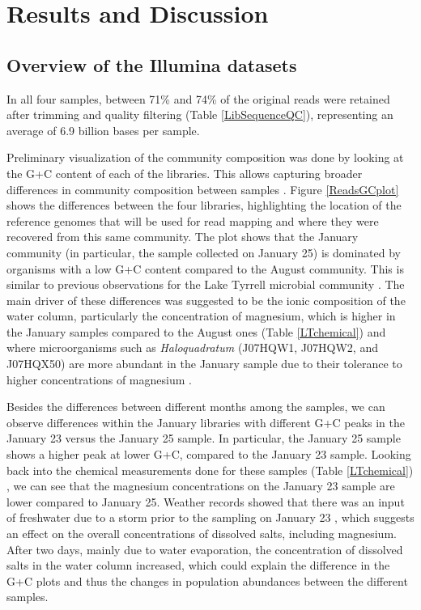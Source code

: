 \clearpage
\section{Results and Discussion}

\subsection{Overview of the Illumina datasets}

In all four samples, between 71\% and 74\% of the original reads were retained after trimming and quality filtering (Table \ref{LibSequenceQC}), representing an average of 6.9 billion bases per sample.

Preliminary visualization of the community composition was done by looking at the G+C content of each of the libraries. This allows capturing broader differences in community composition between samples \cite{Podell:2013kx,Ghai:2012fb,Podell:2013fp}. Figure \ref{ReadsGCplot} shows the differences between the four libraries, highlighting the location of the reference genomes that will be used for read mapping and where they were recovered from this same community. The plot shows that the January community (in particular, the sample collected on January 25) is dominated by organisms with a low G+C content compared to the August community. This is similar to previous observations for the Lake Tyrrell microbial community \cite{Podell:2013fp}. The main driver of these differences was suggested to be the ionic composition of the water column, particularly the concentration of magnesium, which is higher in the January samples compared to the August ones (Table \ref{LTchemical}) and where microorganisms such as \textit{Haloquadratum} (J07HQW1, J07HQW2, and J07HQX50) are more abundant in the January sample due to their tolerance to higher concentrations of magnesium \cite{Podell:2013fp}. 

Besides the differences between different months among the samples, we can observe differences within the January libraries with different G+C peaks in the January 23 versus the January 25 sample. In particular, the January 25 sample shows a higher peak at lower G+C, compared to the January 23 sample. Looking back into the chemical measurements done for these samples (Table \ref{LTchemical}) \cite{Podell:2013fp}, we can see that the magnesium concentrations on the January 23 sample are lower compared to January 25. Weather records showed that there was an input of freshwater due to a storm prior to the sampling on January 23 \cite{Podell:2013fp}, which suggests an effect on the overall concentrations of dissolved salts, including magnesium. After two days, mainly due to water evaporation, the concentration of dissolved salts in the water column increased, which could explain the difference in the G+C plots and thus the changes in population abundances between the different samples.


